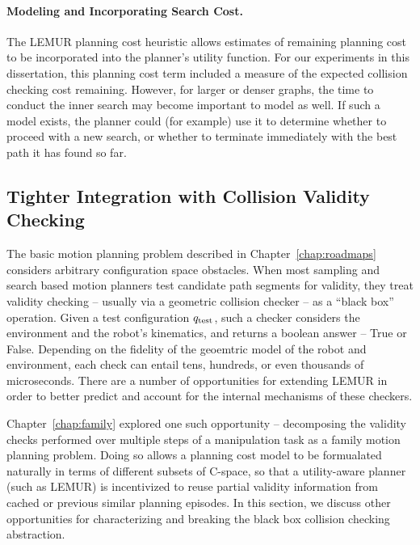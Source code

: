 \paragraph{Modeling and Incorporating Search Cost.}
The LEMUR planning cost heuristic allows estimates of remaining
planning cost to be incorporated into the planner's utility function.
For our experiments in this dissertation,
this planning cost term included a measure of the expected
collision checking cost remaining.
However,
for larger or denser graphs,
the time to conduct the inner search may become important to model
as well.
If such a model exists,
the planner could (for example) use it to determine
whether to proceed with a new search,
or whether to terminate immediately with the best path it has
found so far.

\subsection{Tighter Integration with Collision Validity Checking}

The basic motion planning problem described in Chapter~\ref{chap:roadmaps}
considers arbitrary configuration space obstacles.
When most sampling and search based motion planners test
candidate path segments for validity,
they treat validity checking
-- usually via a geometric collision checker --
as a ``black box'' operation.
Given a test configuration $q_{\mbox{\scriptsize test}}$,
such a checker considers the environment
and the robot's kinematics,
and returns a boolean answer -- True or False.
Depending on the fidelity of the geoemtric model of the robot
and environment,
each check can entail tens, hundreds, or even thousands
of microseconds.
There are a number of opportunities for extending LEMUR in order
to better predict and account for the internal mechanisms of these
checkers.

Chapter~\ref{chap:family} explored one such opportunity --
decomposing the validity checks performed over multiple steps of
a manipulation task as a family motion planning problem.
Doing so allows a planning cost model to be formualated naturally
in terms of different subsets of C-space,
so that a utility-aware planner (such as LEMUR)
is incentivized to reuse partial validity information
from cached or previous similar planning episodes.
In this section,
we discuss other opportunities for characterizing and breaking
the black box collision checking abstraction.

